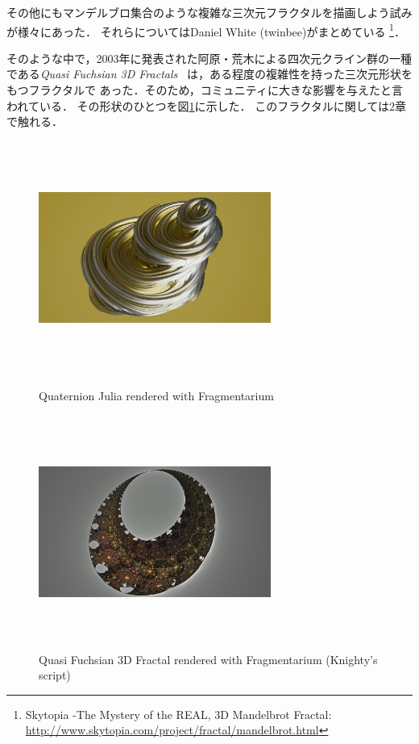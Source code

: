 その他にもマンデルブロ集合のような複雑な三次元フラクタルを描画しよう試み
が様々にあった．
それらについてはDaniel White (twinbee)がまとめている
\footnote{Skytopia -The Mystery of the REAL, 3D Mandelbrot Fractal:~
\url{http://www.skytopia.com/project/fractal/mandelbrot.html}}．

そのような中で，2003年に発表された阿原・荒木による四次元クライン群の一種
である\textit{Quasi Fuchsian 3D Fractals}~\cite{ahara2003sphairahedral}
は，ある程度の複雑性を持った三次元形状をもつフラクタルで
あった．そのため，コミュニティに大きな影響を与えたと言われている．
その形状のひとつを図\ref{fig:quasi-fuchsian-3d}に示した．
このフラクタルに関しては2章で触れる．

\begin{figure}[htbp]
  \begin{minipage}[t]{0.49\hsize}
   \center
   \includegraphics[width=3in, height=3in, keepaspectratio]{../img/fractal/qjulia.pdf}
   \caption{Quaternion Julia rendered with Fragmentarium}
   \label{fig:qjulia}
  \end{minipage}
 \begin{minipage}[t]{0.49\hsize}
  \center
  \includegraphics[width=3in, height=3in, keepaspectratio]{../img/fractal/quasi-fuchsian.pdf}
  \caption{Quasi Fuchsian 3D Fractal rendered with Fragmentarium
  (Knighty's script)}
  \label{fig:quasi-fuchsian-3d}
 \end{minipage}
\end{figure}

